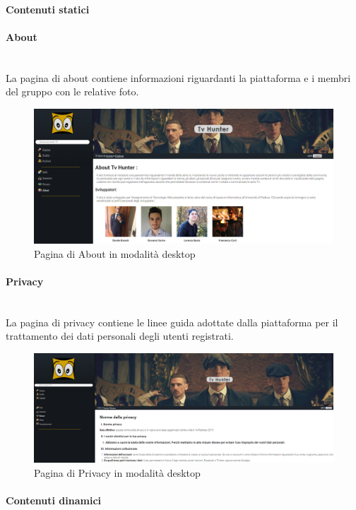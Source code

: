 \paragraph{Contenuti statici}

\paragraph{About} 
~\\	
La pagina di about contiene informazioni riguardanti la piattaforma e i membri del gruppo con le relative foto. 
\begin{figure}[H]
	\centerline{\includegraphics[scale=0.33]{img/about.png}}
	\caption{Pagina di About in modalità desktop}
	\label{fig:addForm} 
\end{figure}	

\paragraph{Privacy} 
~\\	
La pagina di privacy contiene le linee guida adottate dalla piattaforma per il trattamento dei dati personali degli utenti registrati.
\begin{figure}[h!]
	\centerline{\includegraphics[scale=0.23]{img/privacy.png}}
	\caption{Pagina di Privacy in modalità desktop}
	\label{fig:addForm} 
\end{figure}	

\paragraph{Contenuti dinamici}   

